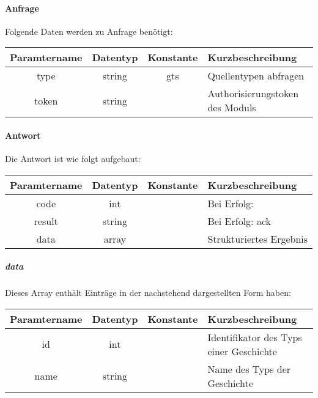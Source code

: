 \paragraph{Anfrage}Folgende Daten werden zu Anfrage benötigt:
\begin{table}[H]
	\begin{tabular}{|c|c|c|p{6.5cm}|}
		\hline
		\textbf{Paramtername} & \textbf{Datentyp} & \textbf{Konstante} & \textbf{Kurzbeschreibung}                                                                                               \\ \hline
		type                & string            & gts                & Quellentypen abfragen \\ \hline
		token               & string            &                    & Authorisierungstoken des Moduls \\ \hline
	\end{tabular}
\end{table}
\paragraph{Antwort}Die Antwort ist wie folgt aufgebaut:
\begin{table}[H]
	\begin{tabular}{|c|c|c|p{6.5cm}|}
		\hline
		\textbf{Paramtername} & \textbf{Datentyp} & \textbf{Konstante} & \textbf{Kurzbeschreibung}            \\ \hline                
		code                & int              &                 & Bei Erfolg: {\glqq 0\grqq} \\ \hline
		result              & string           &                 & Bei Erfolg: {\glqq ack\grqq} \\ \hline
		data                & array            &                 & Strukturiertes Ergebnis \\ \hline
	\end{tabular}
\end{table}
\subparagraph{data}Dieses Array enthält Einträge in der nachstehend dargestellten Form haben:
\begin{table}[H]
	\begin{tabular}{|c|c|c|p{6.5cm}|}
		\hline
		\textbf{Paramtername} & \textbf{Datentyp} & \textbf{Konstante} & \textbf{Kurzbeschreibung}    \\ \hline
		id                 & int               &                 & Identifikator des Typs einer Geschichte \\ \hline
		name               & string            &                 & Name des Typs der Geschichte \\ \hline
	\end{tabular}
\end{table}
